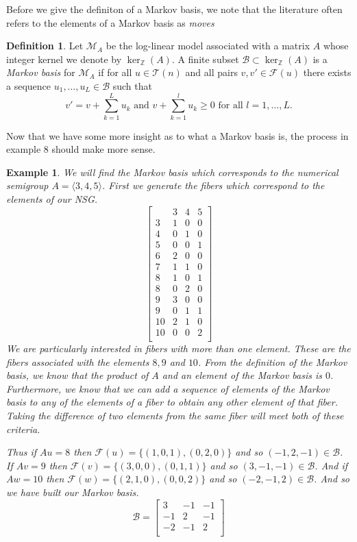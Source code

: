 \documentclass[11pt]{amsart}
\theoremstyle{plain}
\newtheorem{exa}{Example}
\theoremstyle{definition}
\newtheorem{defi}{Definition}
\begin{document}
Before we give the definiton of a Markov basis, we note that the literature often refers to the elements of a Markov basis as \emph{moves}\cite[p.16]{bernd}
\begin{defi}
\cite{bernd}
Let $\mathcal{M}_A$ be the log-linear model associated with a matrix $A$ whose integer kernel we denote by $\ker_\mathbb{Z}(A)$.
A finite subset $\mathcal{B}\subset\ker_{\mathbb{Z}}(A)$ is a \emph{Markov basis} for $\mathcal{M}_A$ if for all $u\in \mathcal{T}(n)$ and all pairs $v,v'\in \mathcal{F}(u)$ there exists a sequence $u_1,\dots,u_L\in  \mathcal{B}$ such that
\[v'=v+\sum\limits_{k=1}^L{u_k}\text{ and }v+\sum\limits_{k=1}^l{u_k}\ge 0\text{ for all }l=1,\dots,L.\]
\end{defi}

Now that we have some more insight as to what a Markov basis is, the process in
example 8 should make more sense.
\begin{exa}
  We will find the Markov basis which corresponds to the numerical semigroup
$A=\langle 3,4,5\rangle$. First we generate the fibers which correspond to the
elements of our NSG.
\[\left[\begin{array}{r|rrr}
&3&4&5\\
\hline
3&1&0&0\\
4&0&1&0\\
5&0&0&1\\
6&2&0&0\\
7&1&1&0\\
8&1&0&1\\
8&0&2&0\\
9&3&0&0\\
9&0&1&1\\
10&2&1&0\\
10&0&0&2\\
\end{array}\right]
\]
We are particularly interested in fibers with more than one element. These are
the fibers associated with the elements $8,9$ and $10$. From the definition of
the Markov basis, we know that the product of $A$ and an element of the Markov
basis is $0$. Furthermore, we know that we can add a sequence of elements of the
Markov basis to any of the elements of a fiber to obtain any other element of
that fiber. Taking the difference of two elements from the same fiber will
meet both of these criteria.

Thus if $Au=8$ then $\mathcal{F}(u)=\{(1,0,1),(0,2,0)\}$ and so
$(-1,2,-1)\in\mathcal{B}$.
If $Av=9$ then $\mathcal{F}(v)=\{(3,0,0),(0,1,1)\}$ and so
$(3,-1,-1)\in\mathcal{B}$.
And if $Aw=10$ then $\mathcal{F}(w)=\{(2,1,0),(0,0,2)\}$ and so
$(-2,-1,2)\in\mathcal{B}$.
And so we have built our Markov basis.
\[
  \mathcal{B}=\left[\begin{array}{rrr}
  3&-1&-1\\
  -1&2&-1\\
  -2&-1&2\\
  \end{array}\right]
\]
\end{exa}
\end{document}
